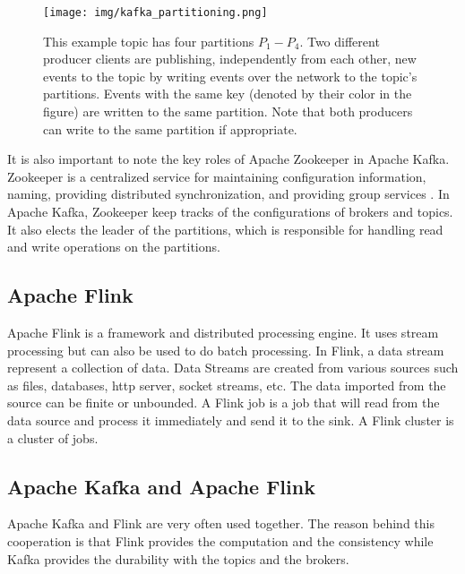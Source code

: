 \documentclass[utf8,9pt]{extarticle}
\begin{document}
\begin{figure}[h!]
    \centering
    \texttt{[image: img/kafka\_partitioning.png]}
    \caption{This example topic has four partitions $P_1 - P_4$. Two different producer clients are publishing, independently from each other, new events to the topic by writing events over the network to the topic's partitions. Events with the same key (denoted by their color in the figure) are written to the same partition. Note that both producers can write to the same partition if appropriate. \cite{kafka}}
    \label{kafka_partitioning}
\end{figure}

It is also important to note the key roles of Apache Zookeeper in Apache Kafka. Zookeeper is a centralized service for maintaining configuration information, naming, providing distributed synchronization, and providing group services \cite{zookeeper}. In Apache Kafka, Zookeeper keep tracks of the configurations of brokers and topics. It also elects the leader of the partitions, which is responsible for handling read and write operations on the partitions.


\subsection{Apache Flink}

\hspace{2 mm} Apache Flink is a framework and distributed processing engine. It uses stream processing but can also be used to do batch processing. In Flink, a data stream represent a collection of data. Data Streams are created from various sources such as files, databases, http server, socket streams, etc. The data imported from the source can be finite or unbounded. A Flink job is a job that will read from the data source and process it immediately and send it to the sink.
A Flink cluster is a cluster of jobs.


\subsection{Apache Kafka and Apache Flink}

\hspace{2 mm} Apache Kafka and Flink are very often used together. The reason behind this cooperation is that Flink provides the computation and the consistency while Kafka provides the durability with the topics and the brokers.
\end{document}
